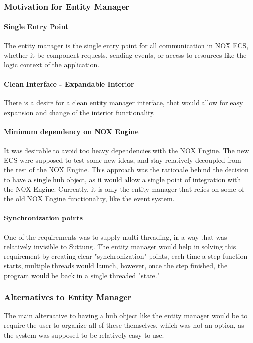 \subsubsection{Motivation for Entity Manager}
\paragraph{Single Entry Point}
The entity manager is the single entry point for all communication in NOX ECS,
whether it be component requests, sending events, or access to resources like the
logic context of the application.

\paragraph{Clean Interface - Expandable Interior}
There is a desire for a clean entity manager interface, that would allow for easy expansion and change of the interior functionality.

\paragraph{Minimum dependency on NOX Engine}
It was desirable to avoid too heavy dependencies with the NOX Engine.
The new ECS were supposed to test some new ideas, and stay relatively decoupled from
the rest of the NOX Engine.
This approach was the rationale behind the decision to have a single hub object, as it would allow a single point of integration with the NOX Engine.
Currently, it is only the entity manager that relies on some of the old NOX Engine functionality, like the event system.

\paragraph{Synchronization points}
One of the requirements was to supply multi-threading, in a way that was relatively invisible to Suttung. 
The entity manager would help in solving this requirement by creating clear "synchronization" points, each time a step function starts, multiple threads would launch, however, once the step finished, the program would be back in a single threaded "state."

\subsubsection{Alternatives to Entity Manager}
The main alternative to having a hub object like the entity manager would be to require
the user to organize all of these themselves, which was not an option, as the system was supposed to be relatively easy to use.

